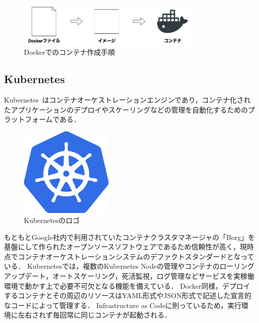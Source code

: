\begin{figure}[htbp]
\begin{center}
    \includegraphics[width=0.8\textwidth]{./figures/docker-process.jpg}
    \caption{Dockerでのコンテナ作成手順}
\end{center}
\end{figure}

\subsection{Kubernetes}
\label{background:container-orchestration-system:kubernetes}

Kubernetes~\cite{Kubernetes}はコンテナオーケストレーションエンジンであり，コンテナ化されたアプリケーションのデプロイやスケーリングなどの管理を自動化するためのプラットフォームである．

\begin{figure}[htbp]
\begin{center}
    \includegraphics[width=0.4\textwidth]{./figures/kubernetes_logo.png}
    \caption{Kubernetesのロゴ}
\end{center}
\end{figure}

もともとGoogle社内で利用されていたコンテナクラスタマネージャの「Borg」を基盤にして作られたオープンソースソフトウェアであるため信頼性が高く，現時点でコンテナオーケストレーションシステムのデファクトスタンダードとなっている．
Kubernetesでは，複数のKubernetes Nodeの管理やコンテナのローリングアップデート，オートスケーリング，死活監視，ログ管理などサービスを実稼働環境で動かす上で必要不可欠となる機能を備えている．
Docker同様，デプロイするコンテナとその周辺のリソースはYAML形式やJSON形式で記述した宣言的なコードによって管理する．
Infrastructure as Codeに則っているため，実行環境に左右されず毎回常に同じコンテナが起動される．

